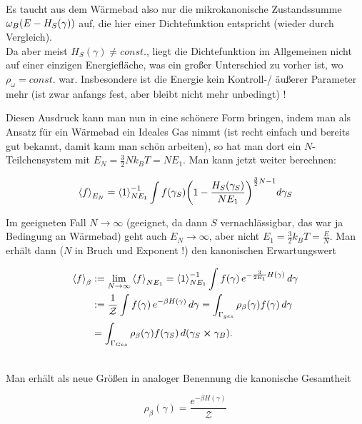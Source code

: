 Es taucht aus dem Wärmebad also nur die mikrokanonische Zustandssumme $\omega_B\qty(E-H_S(\gamma))$ auf, die hier einer Dichtefunktion entspricht (wieder durch Vergleich).\\
Da aber meist $H_S(\gamma) \neq const.$, liegt die Dichtefunktion im Allgemeinen nicht auf einer einzigen Energiefläche, was ein großer Unterschied zu vorher ist, wo $\rho_\omega = const.$ war. %
Insbesondere ist die Energie kein Kontroll-/ äußerer Parameter mehr (ist zwar anfangs fest, aber bleibt nicht mehr unbedingt) !

Diesen Ausdruck kann man nun in eine schönere Form bringen, indem man als Ansatz für ein Wärmebad ein Ideales Gas nimmt (ist recht einfach und bereits gut bekannt, damit kann man schön arbeiten), so hat man dort ein $N$-Teilchensystem mit $E_N = \frac{3}{2} N k_B T = N E_1$. Man kann jetzt weiter berechnen:

\begin{equation*}
\expval{f}_{E_N} = \expval{1}_{N E_1}^{-1} \int f(\gamma_S) \qty(1 - \frac{H_S(\gamma_S)}{N E_1})^{\frac{3}{2} N - 1} d\gamma_S
\end{equation*}

Im geeigneten Fall $N \rightarrow \infty$ (geeignet, da dann $S$ vernachlässigbar, das war ja Bedingung an Wärmebad) geht auch $E_N \rightarrow \infty$, aber nicht $E_1 = \frac{3}{2} k_B T = \frac{E}{N}$. Man erhält dann ($N$ in Bruch und Exponent !) den kanonischen Erwartungswert

\begin{align}
\expval{f}_\beta &:= \lim_{N \rightarrow \infty} \expval{f}_{N E_1} = \expval{1}_{N E_1}^{-1} \int f(\gamma) \, e^{-\frac{3}{2 E_1} H(\gamma)} \, d\gamma 
\notag\\
&:= \frac{1}{\mathcal{Z}} \int f(\gamma) \, e^{-\beta H(\gamma)} \, d\gamma = \int_{\Gamma_{ges}} \rho_\beta(\gamma) f(\gamma) \, d\gamma
\\
&= \int_{\Gamma_{Ges}} \rho_\beta(\gamma) f(\gamma_S) \, d\qty(\gamma_S \cross \gamma_B)\notag .
\end{align}

	\\

Man erhält als neue Größen in analoger Benennung die kanonische Gesamtheit

\begin{equation}
\rho_\beta(\gamma) = \frac{e^{-\beta H(\gamma)}}{\mathcal{Z}}
\end{equation}

